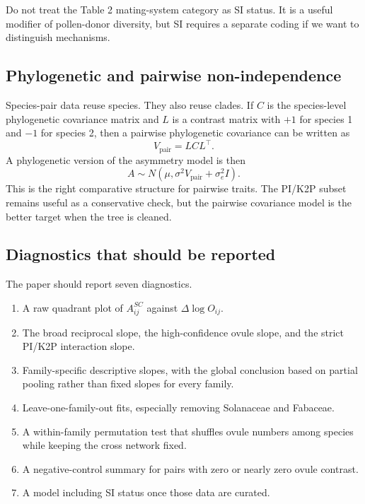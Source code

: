 \begin{cautionbox}
Do not treat the Table 2 mating-system category as SI status. It is a useful modifier of pollen-donor diversity, but SI requires a separate coding if we want to distinguish mechanisms.
\end{cautionbox}

\subsection{Phylogenetic and pairwise non-independence}

Species-pair data reuse species. They also reuse clades. If $C$ is the species-level phylogenetic covariance matrix and $L$ is a contrast matrix with $+1$ for species 1 and $-1$ for species 2, then a pairwise phylogenetic covariance can be written as
\begin{equation}
V_{\mathrm{pair}}=LCL^{\top}.
\label{eq:pairwise-phylo-covariance}
\end{equation}
A phylogenetic version of the asymmetry model is then
\begin{equation}
A\sim N(\mu,\sigma^2V_{\mathrm{pair}}+\sigma_e^2I).
\label{eq:phylo-analysis}
\end{equation}
This is the right comparative structure for pairwise traits. The PI/K2P subset remains useful as a conservative check, but the pairwise covariance model is the better target when the tree is cleaned.

\subsection{Diagnostics that should be reported}

The paper should report seven diagnostics.

\begin{enumerate}
\item A raw quadrant plot of $A^{SC}_{ij}$ against $\Delta\log O_{ij}$.
\item The broad reciprocal slope, the high-confidence ovule slope, and the strict PI/K2P interaction slope.
\item Family-specific descriptive slopes, with the global conclusion based on partial pooling rather than fixed slopes for every family.
\item Leave-one-family-out fits, especially removing Solanaceae and Fabaceae.
\item A within-family permutation test that shuffles ovule numbers among species while keeping the cross network fixed.
\item A negative-control summary for pairs with zero or nearly zero ovule contrast.
\item A model including SI status once those data are curated.
\end{enumerate}

